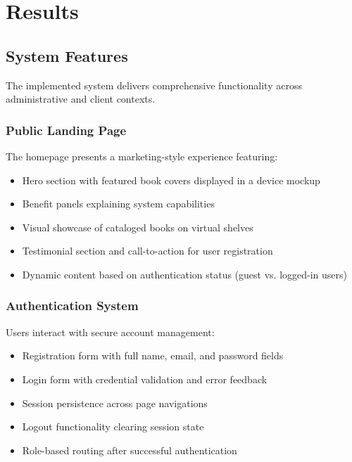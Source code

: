 \documentclass[12pt,a4paper]{article}
\begin{document}
\newpage
\section{Results}

\subsection{System Features}

The implemented system delivers comprehensive functionality across administrative and client contexts.

\subsubsection{Public Landing Page}

The homepage presents a marketing-style experience featuring:

\begin{itemize}[leftmargin=*]
    \item Hero section with featured book covers displayed in a device mockup
    \item Benefit panels explaining system capabilities
    \item Visual showcase of cataloged books on virtual shelves
    \item Testimonial section and call-to-action for user registration
    \item Dynamic content based on authentication status (guest vs. logged-in users)
\end{itemize}

\subsubsection{Authentication System}

Users interact with secure account management:

\begin{itemize}[leftmargin=*]
    \item Registration form with full name, email, and password fields
    \item Login form with credential validation and error feedback
    \item Session persistence across page navigations
    \item Logout functionality clearing session state
    \item Role-based routing after successful authentication
\end{itemize}
\end{document}
